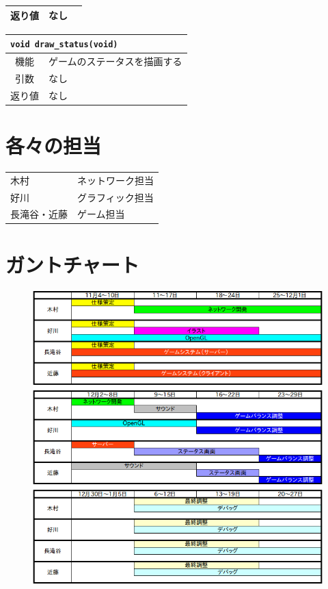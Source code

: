 \documentclass{jarticle}
\begin{document}
\begin{enumerate}
\begin{table}[H]
\begin{center}
\begin{tabular}{|c|p{3em}p{30em}|}
            返り値 & なし & \\ \hline
          \end{tabular}
        \end{center}
      \end{table}
%
      \begin{table}[H]
        \begin{center}
          \begin{tabular}{|c|p{3em}p{30em}|} \hline
            \multicolumn{3}{|l|}{{\tt void draw\_status(void)}}\\ \hline \hline
            機能 & \multicolumn{2}{|l|}{ゲームのステータスを描画する}\\
            引数 & なし & \\
            返り値 & なし & \\ \hline
          \end{tabular}
        \end{center}
      \end{table}
\end{enumerate}

\section{各々の担当}
\begin{table}[H]
  \begin{tabular}{ll}
    木村 & ネットワーク担当\\
    好川 & グラフィック担当\\
    長滝谷・近藤 & ゲーム担当\\
  \end{tabular}
\end{table}
\section{ガントチャート}
\begin{figure}[H]
  \begin{center}
    \includegraphics[scale=0.5]{chart.png}
  \end{center}
\end{figure}
\end{document}
